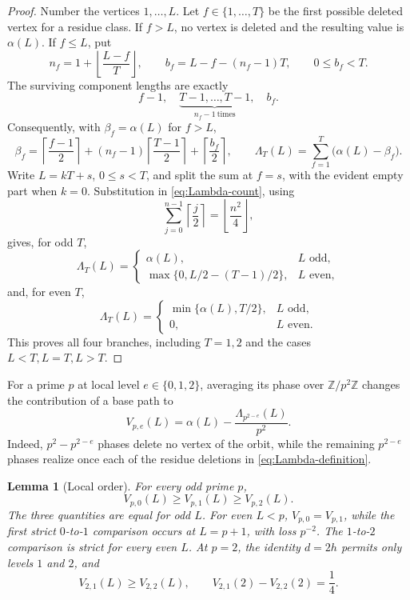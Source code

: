 \documentclass[12pt,a4paper]{article}
\newtheorem{lemma}[theorem]{Lemma}
\theoremstyle{definition}
\newcommand{\Z}{\mathbb Z}
\begin{document}
\begin{proof}
Number the vertices \(1,\ldots,L\).  Let \(f\in\{1,\ldots,T\}\) be the
first possible deleted vertex for a residue class.  If \(f>L\), no vertex is
deleted and the resulting value is \(\alpha(L)\).  If \(f\leq L\), put
\[
 n_f=1+\left\lfloor\frac{L-f}{T}\right\rfloor,
 \qquad b_f=L-f-(n_f-1)T,
 \qquad 0\leq b_f<T.
\]
The surviving component lengths are exactly
\[
 f-1,\quad
 \underbrace{T-1,\ldots,T-1}_{n_f-1\ \mathrm{times}},\quad b_f.
\]
Consequently, with \(\beta_f=\alpha(L)\) for \(f>L\),
\begin{equation}
 \beta_f=
 \left\lceil\frac{f-1}{2}\right\rceil
 +(n_f-1)\left\lceil\frac{T-1}{2}\right\rceil
 +\left\lceil\frac{b_f}{2}\right\rceil,
 \qquad
 \Lambda_T(L)=\sum_{f=1}^{T}\bigl(\alpha(L)-\beta_f\bigr).
 \label{eq:Lambda-count}
\end{equation}
Write \(L=kT+s\), \(0\leq s<T\), and split the sum at \(f=s\), with the
evident empty part when \(k=0\).  Substitution in
\eqref{eq:Lambda-count}, using
\[
 \sum_{j=0}^{n-1}\left\lceil\frac j2\right\rceil
 =\left\lfloor\frac{n^2}{4}\right\rfloor,
\]
gives, for odd \(T\),
\[
 \Lambda_T(L)=
 \begin{cases}
  \alpha(L),&L\text{ odd},\\
  \max\{0,L/2-(T-1)/2\},&L\text{ even},
 \end{cases}
\]
and, for even \(T\),
\[
 \Lambda_T(L)=
 \begin{cases}
  \min\{\alpha(L),T/2\},&L\text{ odd},\\
  0,&L\text{ even}.
 \end{cases}
\]
This proves all four branches, including \(T=1,2\) and the cases
\(L<T,L=T,L>T\).
\end{proof}

For a prime \(p\) at local level \(e\in\{0,1,2\}\), averaging its phase over
\(\Z/p^2\Z\) changes the contribution of a base path to
\begin{equation}
 V_{p,e}(L)=\alpha(L)-
 \frac{\Lambda_{p^{2-e}}(L)}{p^2}.
 \label{eq:local-V}
\end{equation}
Indeed, \(p^2-p^{2-e}\) phases delete no vertex of the orbit, while the
remaining \(p^{2-e}\) phases realize once each of the residue deletions in
\eqref{eq:Lambda-definition}.

\begin{lemma}[Local order]
\label{lem:local-order}
For every odd prime \(p\),
\begin{equation}
 V_{p,0}(L)\geq V_{p,1}(L)\geq V_{p,2}(L).
 \label{eq:odd-local-order}
\end{equation}
The three quantities are equal for odd \(L\).  For even \(L<p\),
\(V_{p,0}=V_{p,1}\), while the first strict \(0\)-to-\(1\) comparison occurs
at \(L=p+1\), with loss \(p^{-2}\).  The \(1\)-to-\(2\) comparison is strict
for every even \(L\).  At \(p=2\), the identity \(d=2h\) permits only levels
\(1\) and \(2\), and
\[
 V_{2,1}(L)\geq V_{2,2}(L),
 \qquad V_{2,1}(2)-V_{2,2}(2)=\frac14.
\]
\end{lemma}
\end{document}
